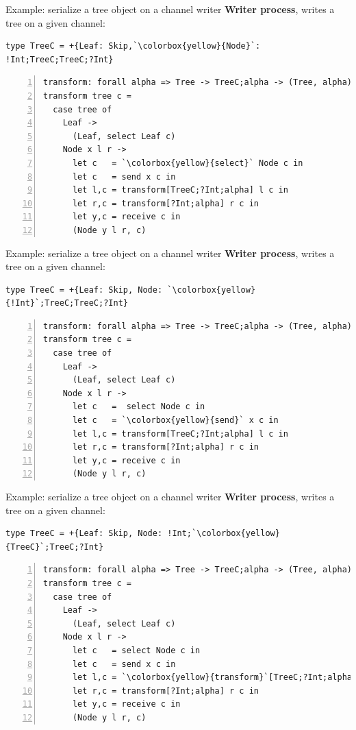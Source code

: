 \documentclass[10pt]{beamer}
\begin{document}
\begin{frame}[fragile]{Example:  serialize a tree object on a channel \hfill{\color{mLightBrown}writer}}
	\textbf{Writer process}, writes a tree on a given channel:
	
\begin{lstlisting}[escapeinside=\`\`]
type TreeC = +{Leaf: Skip,`\colorbox{yellow}{Node}`: !Int;TreeC;TreeC;?Int}
\end{lstlisting}
\begin{lstlisting}[numbers=left, xleftmargin=0.7cm, escapeinside=\`\`]
transform: forall alpha => Tree -> TreeC;alpha -> (Tree, alpha)
transform tree c =
  case tree of
    Leaf ->
      (Leaf, select Leaf c)
    Node x l r ->
      let c   = `\colorbox{yellow}{select}` Node c in
      let c   = send x c in 
      let l,c = transform[TreeC;?Int;alpha] l c in
      let r,c = transform[?Int;alpha] r c in
      let y,c = receive c in
      (Node y l r, c)
\end{lstlisting}
\end{frame}

\begin{frame}[fragile]{Example:  serialize a tree object on a channel \hfill{\color{mLightBrown}writer}}
	\textbf{Writer process}, writes a tree on a given channel:
	
\begin{lstlisting}[escapeinside=\`\`]
type TreeC = +{Leaf: Skip, Node: `\colorbox{yellow}{!Int}`;TreeC;TreeC;?Int}
\end{lstlisting}
\begin{lstlisting}[numbers=left, xleftmargin=0.7cm, escapeinside=\`\`]
transform: forall alpha => Tree -> TreeC;alpha -> (Tree, alpha)
transform tree c =
  case tree of
    Leaf ->
      (Leaf, select Leaf c)
    Node x l r ->
      let c   =  select Node c in
      let c   = `\colorbox{yellow}{send}` x c in 
      let l,c = transform[TreeC;?Int;alpha] l c in
      let r,c = transform[?Int;alpha] r c in
      let y,c = receive c in
      (Node y l r, c)
\end{lstlisting}
\end{frame}

\begin{frame}[fragile]{Example:  serialize a tree object on a channel \hfill{\color{mLightBrown}writer}}
	\textbf{Writer process}, writes a tree on a given channel:
	
\begin{lstlisting}[escapeinside=\`\`]
type TreeC = +{Leaf: Skip, Node: !Int;`\colorbox{yellow}{TreeC}`;TreeC;?Int}
\end{lstlisting}
\begin{lstlisting}[numbers=left, xleftmargin=0.7cm, escapeinside=\`\`]
transform: forall alpha => Tree -> TreeC;alpha -> (Tree, alpha)
transform tree c =
  case tree of
    Leaf ->
      (Leaf, select Leaf c)
    Node x l r ->
      let c   = select Node c in
      let c   = send x c in 
      let l,c = `\colorbox{yellow}{transform}`[TreeC;?Int;alpha] l c in
      let r,c = transform[?Int;alpha] r c in
      let y,c = receive c in
      (Node y l r, c)
\end{lstlisting}
\end{frame}
\end{document}
